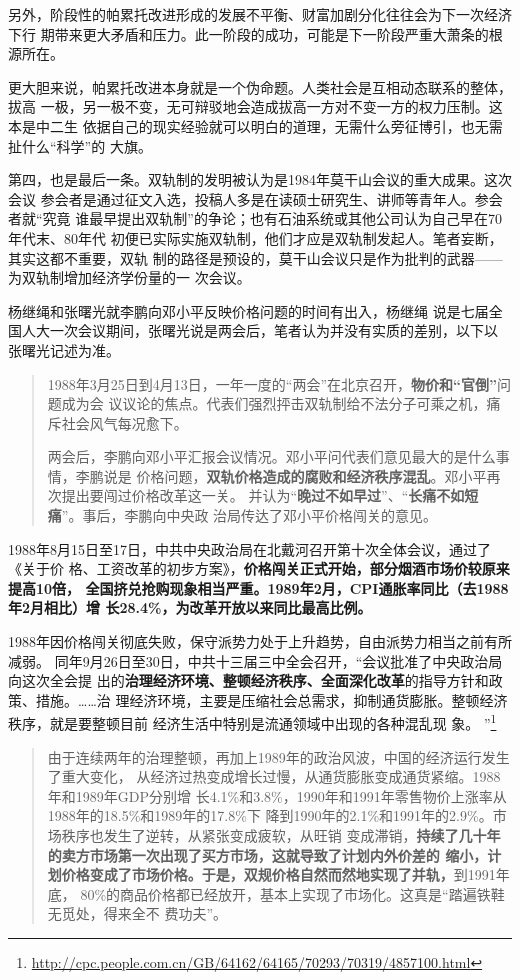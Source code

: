 另外，阶段性的帕累托改进形成的发展不平衡、财富加剧分化往往会为下一次经济下行
期带来更大矛盾和压力。此一阶段的成功，可能是下一阶段严重大萧条的根源所在。

更大胆来说，帕累托改进本身就是一个伪命题。人类社会是互相动态联系的整体，拔高
一极，另一极不变，无可辩驳地会造成拔高一方对不变一方的权力压制。这本是中二生
依据自己的现实经验就可以明白的道理，无需什么旁征博引，也无需扯什么“科学”的
大旗。

第四，也是最后一条。双轨制的发明被认为是1984年莫干山会议的重大成果。这次会议
参会者是通过征文入选，投稿人多是在读硕士研究生、讲师等青年人。参会者就“究竟
谁最早提出双轨制”的争论；也有石油系统或其他公司认为自己早在70年代末、80年代
初便已实际实施双轨制，他们才应是双轨制发起人。笔者妄断，其实这都不重要，双轨
制的路径是预设的，莫干山会议只是作为批判的武器——为双轨制增加经济学份量的一
次会议。

杨继绳\cite{yangshuanggui}和张曙光就李鹏向邓小平反映价格问题的时间有出入，杨继绳
说是七届全国人大一次会议期间，张曙光说是两会后，笔者认为并没有实质的差别，以下以
张曙光记述为准。
\begin{quotation}
  1988年3月25日到4月13日，一年一度的“两会”在北京召开，\textbf{物价和“官倒”}问题成为会
  议议论的焦点。代表们强烈抨击双轨制给不法分子可乘之机，痛斥社会风气每况愈下。

  两会后，李鹏向邓小平汇报会议情况。邓小平问代表们意见最大的是什么事情，李鹏说是
  价格问题，\textbf{双轨价格造成的腐败和经济秩序混乱}。邓小平再次提出要闯过价格改革这一关。
  并认为“\textbf{晚过不如早过}”、“\textbf{长痛不如短痛}”。事后，李鹏向中央政
  治局传达了邓小平价格闯关的意见。\cite[563]{fengyunshi1b}
\end{quotation}

1988年8月15日至17日，中共中央政治局在北戴河召开第十次全体会议，通过了《关于价
格、工资改革的初步方案》，\textbf{价格闯关正式开始，部分烟酒市场价较原来提高10倍，
  全国挤兑抢购现象相当严重。1989年2月，CPI通胀率同比（去1988年2月相比）增
  长28.4\%，为改革开放以来同比最高比例。}

1988年因价格闯关彻底失败，保守派势力处于上升趋势，自由派势力相当之前有所减弱。
同年9月26日至30日，中共十三届三中全会召开，“会议批准了中央政治局向这次全会提
出的\textbf{治理经济环境、整顿经济秩序、全面深化改革}的指导方针和政策、措施。……治
理经济环境，主要是压缩社会总需求，抑制通货膨胀。整顿经济秩序，就是要整顿目前
经济生活中特别是流通领域中出现的各种混乱现
象。
”\footnote{\url{http://cpc.people.com.cn/GB/64162/64165/70293/70319/4857100.html}}

\begin{quotation}
  由于连续两年的治理整顿，再加上1989年的政治风波，中国的经济运行发生了重大变化，
  从经济过热变成增长过慢，从通货膨胀变成通货紧缩。1988年和1989年GDP分别增
  长4.1\%和3.8\%，1990年和1991年零售物价上涨率从1988年的18.5\%和1989年的17.8\%下
  降到1990年的2.1\%和1991年的2.9\%。市场秩序也发生了逆转，从紧张变成疲软，从旺销
  变成滞销，\textbf{持续了几十年的卖方市场第一次出现了买方市场，这就导致了计划内外价差的
  缩小，计划价格变成了市场价格。于是，双规价格自然而然地实现了并轨，}到1991年底，
  80\%的商品价格都已经放开，基本上实现了市场化。这真是“踏遍铁鞋无觅处，得来全不
  费功夫”。\cite[579]{fengyunshi1b}
\end{quotation}

